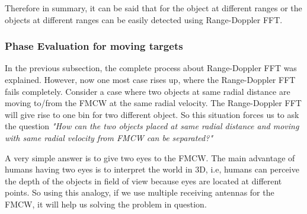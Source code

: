 Therefore in summary, it can be said that for the object at different ranges or the objects at different ranges can be easily detected using Range-Doppler FFT.

\subsubsection{Phase Evaluation for moving targets}

In the previous subsection, the complete process about Range-Doppler FFT was explained. However, now one most case rises up, where the Range-Doppler FFT fails completely. Consider a case where two objects at same radial distance are moving to/from the FMCW at the same radial velocity. The Range-Doppler FFT will give rise to one bin for two different object. So this situation forces us to ask the question
\textit{"How can the two objects placed at same radial distance and moving with same radial velocity from FMCW can be  separated?"}

A very simple answer is to give two eyes to the FMCW. The main advantage of humans having two eyes is to interpret the world in 3D, i.e, humans can perceive the depth of the objects in field of view because eyes are located at different points. So using this analogy, if we use multiple receiving antennas for the FMCW, it will help us solving the problem in question.

